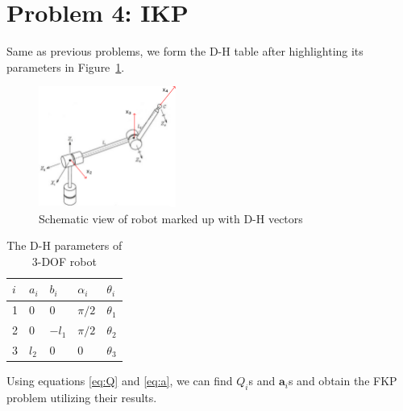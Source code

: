 \documentclass[conference]{IEEEtran}
\begin{document}
\vspace{30px}
\section{Problem 4: IKP}
Same as previous problems, we form the D-H table after highlighting its parameters in Figure~\ref{fig:prob4}.

\begin{figure}[htbp]
    \centerline{\includegraphics[width=0.4\textwidth]{figures/prob4.png}}
    \caption{Schematic view of robot marked up with D-H vectors}
    \label{fig:prob4}
\end{figure}

\begin{table}[htbp]
    \caption{The D-H parameters of 3-DOF robot}
    \def\arraystretch{1.75}
    \begin{center}
        \begin{tabular}{|Y|Y|Y|Y|Y|}
            \hline
            $i$ & $a_i$ & $b_i$  & $\alpha_i$ & $\theta_i$ \\
               & 0     & 0      & $\pi / 2$  & $\theta_1$ \\
               & 0     & $-l_1$ & $\pi / 2$  & $\theta_2$ \\
               & $l_2$ & 0      & 0          & $\theta_3$ \\
            \hline
        \end{tabular}
    \end{center}
\end{table}

Using equations \ref{eq:Q} and \ref{eq:a}, we can find $Q_i$s and $\mathbf{a}_i$s and obtain the FKP problem utilizing their results.
\end{document}
